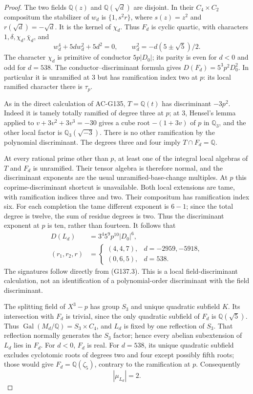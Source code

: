 \begin{proof}
The two fields $\mathbb Q(z)$ and $\mathbb Q(\sqrt d)$ are disjoint.
In their $C_4\times C_2$ compositum the stabilizer of $w_d$ is
$\{1,s^2r\}$, where $s(z)=z^2$ and $r(\sqrt d)=-\sqrt d$.
It is the kernel of $\chi_d$.  Thus $F_d$ is cyclic quartic,
with characters $1,\delta,\chi_d,\bar\chi_d$, and
\[
 w_d^4+5d w_d^2+5d^2=0,\qquad
 w_d^2=-d(5\pm\sqrt5)/2.
 \tag{G137.3}
\]
The character $\chi_d$ is primitive of conductor $5p|D_0|$;
its parity is even for $d<0$ and odd for $d=538$.
The conductor--discriminant formula gives
$D(F_d)=5^3p^2D_0^2$.
In particular it is unramified at $3$ but has ramification index
two at $p$: its local ramified character there is $\tau_p$.

As in the direct calculation of AC-G135, $T=\mathbb Q(t)$ has
discriminant $-3p^2$.  Indeed it is tamely totally ramified of
degree three at $p$; at $3$, Hensel's lemma applied to
$v+3v^2+3v^3=-30$ gives a cube root $-(1+3v)$ of $p$ in
$\mathbb Q_3$, and the other local factor is
$\mathbb Q_3(\sqrt{-3})$.
There is no other ramification by the polynomial discriminant.
The degrees three and four imply $T\cap F_d=\mathbb Q$.

At every rational prime other than $p$, at least one of the
integral local algebras of $T$ and $F_d$ is unramified.
Their tensor algebra is therefore normal, and the discriminant
exponents are the usual unramified-base-change multiples.
At $p$ this coprime-discriminant shortcut is unavailable.
Both local extensions are tame, with ramification indices three
and two.  Their compositum has ramification index six.
For each completion the tame different exponent is $6-1$;
since the total degree is twelve, the sum of residue degrees is two.
Thus the discriminant exponent at $p$ is ten, rather than fourteen.
It follows that
\[
 \begin{split}
 D(L_d)&=3^4 5^9p^{10}|D_0|^6,\\
 (r_1,r_2,r)&=
 \begin{cases}(4,4,7),&d=-2959,-5918,\\(0,6,5),&d=538.
 \end{cases}
 \end{split}
 \tag{G137.4}
\]
The signatures follow directly from (G137.3).
This is a local field-discriminant calculation, not an identification
of a polynomial-order discriminant with the field discriminant.

The splitting field of $X^3-p$ has group $S_3$ and unique quadratic
subfield $K$.  Its intersection with $F_d$ is trivial, since the
only quadratic subfield of $F_d$ is $\mathbb Q(\sqrt5)$.
Thus $\operatorname{Gal}(M_d/\mathbb Q)=S_3\times C_4$, and $L_d$
is fixed by one reflection of $S_3$.
That reflection normally generates the $S_3$ factor; hence every
abelian subextension of $L_d$ lies in $F_d$.
For $d<0$, $F_d$ is real.  For $d=538$, its unique quadratic
subfield excludes cyclotomic roots of degrees two and four except
possibly fifth roots; those would give $F_d=\mathbb Q(\zeta_5)$,
contrary to the ramification at $p$.
Consequently
\[
                         |\mu_{L_d}|=2.
 \tag{G137.5}
\]


\end{proof}
